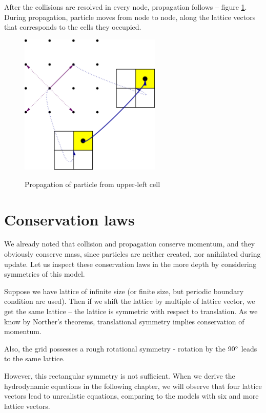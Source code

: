 After the collisions are resolved in every node, propagation follows -- figure \ref{hpp-prop}.
During propagation, particle moves from node to node, along the lattice vectors that corresponds to the cells they occupied.
\begin{figure} [H]
 \centering
 \includegraphics[width=0.6\textwidth]{./img/HPPprop}
 \label{hpp-prop}
 \caption{Propagation of particle from upper-left cell}
\end{figure}

\bigskip

\section{Conservation laws}

We already noted that collision and propagation conserve momentum, and they obviously conserve mass, since particles are neither created, nor anihilated during update. 
Let us inspect these conservation laws in the more depth by considering symmetries of this model.

Suppose we have lattice of infinite size (or finite size, but periodic boundary condition are used). Then if we shift the lattice by multiple of lattice vector, we get the same lattice -- the lattice is symmetric with respect to translation.
As we know by Norther's theorems, translational symmetry implies conservation of momentum.

\bigskip

Also, the grid possesses a rough rotational symmetry - rotation by the $90\degree$ leads to the same lattice.

However, this rectangular symmetry is not sufficient.
When we derive the hydrodynamic equations in the following chapter, we will observe that four lattice vectors lead to unrealistic equations, comparing to the models with six and more lattice vectors.

